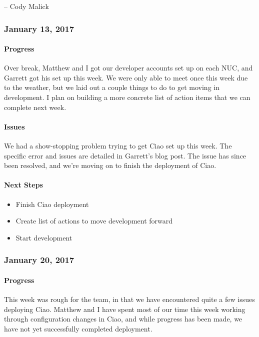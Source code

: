 \documentclass[10pt,onecolumn,journal,draftclsnofoot]{IEEEtran}
\begin{document}
-- Cody Malick

\subsubsection{January 13, 2017} 

\paragraph{Progress} 

Over break, Matthew and I got our developer accounts set up on each NUC,
and Garrett got his set up this week. We were only able to meet once
this week due to the weather, but we laid out a couple things to do to
get moving in development. I plan on building a more concrete list of
action items that we can complete next week.

\paragraph{Issues} 

We had a show-stopping problem trying to get Ciao set up this week. The
specific error and issues are detailed in Garrett's blog post. The issue
has since been resolved, and we're moving on to finish the deployment of
Ciao.

\paragraph{Next Steps} 

\begin{itemize}
\item
  Finish Ciao deployment
\item
  Create list of actions to move development forward
\item
  Start development
\end{itemize}

\subsubsection{January 20, 2017} 

\paragraph{Progress} 

This week was rough for the team, in that we have encountered quite a
few issues deploying Ciao. Matthew and I have spent most of our time
this week working through configuration changes in Ciao, and while
progress has been made, we have not yet successfully completed
deployment.
\end{document}
